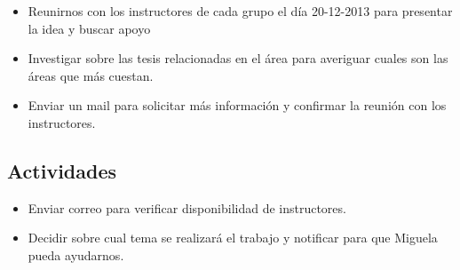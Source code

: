 \begin{itemize}
\itemsep1pt\parskip0pt
\item
  Reunirnos con los instructores de cada grupo el día 20-12-2013 para
  presentar la idea y buscar apoyo
\item
  Investigar sobre las tesis relacionadas en el área para averiguar
  cuales son las áreas que más cuestan.
\item
  Enviar un mail para solicitar más información y confirmar la reunión
  con los instructores.
\end{itemize}

\subsection{Actividades}

\begin{itemize}
\itemsep1pt\parskip0pt
\item
  Enviar correo para verificar disponibilidad de instructores.
\item
  Decidir sobre cual tema se realizará el trabajo y notificar para que
  Miguela pueda ayudarnos.
\end{itemize}
